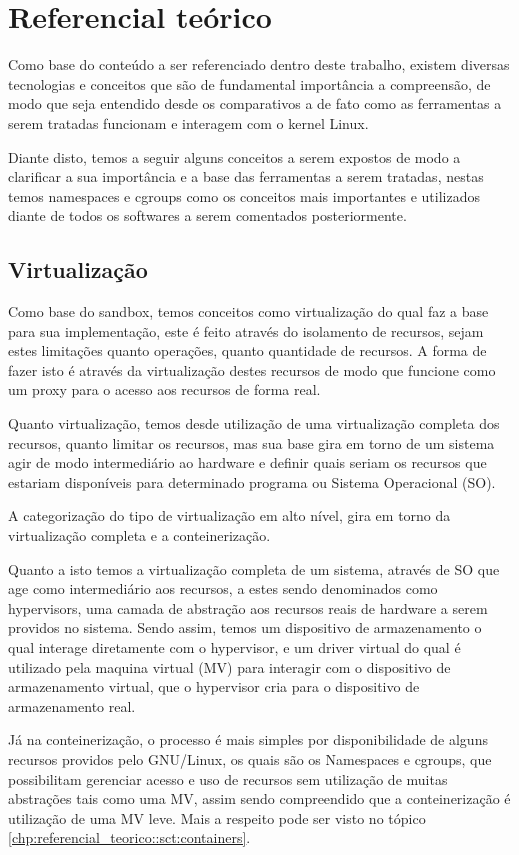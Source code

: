 \chapter{Referencial teórico}

Como base do conteúdo a ser referenciado dentro deste trabalho, existem diversas tecnologias e conceitos que são de fundamental importância a compreensão, de modo que seja entendido desde os comparativos a de fato como as ferramentas a serem tratadas funcionam e interagem com o kernel Linux.

Diante disto, temos a seguir alguns conceitos a serem expostos de modo a clarificar a sua importância e a base das ferramentas a serem tratadas, nestas temos namespaces e cgroups como os conceitos mais importantes e utilizados diante de todos os softwares a serem comentados posteriormente.

\section{Virtualização}
Como base do sandbox, temos conceitos como virtualização do qual faz a base para sua implementação, este é feito através do isolamento de recursos, sejam estes limitações quanto operações, quanto quantidade de recursos. A forma de fazer isto é através da virtualização destes recursos de modo que funcione como um proxy para o acesso aos recursos de forma real.

Quanto virtualização, temos desde utilização de uma virtualização completa dos recursos, quanto limitar os recursos, mas sua base gira em torno de um sistema agir de modo intermediário ao hardware e definir quais seriam os recursos que estariam disponíveis para determinado programa ou Sistema Operacional (SO).

A categorização do tipo de virtualização em alto nível, gira em torno da virtualização completa e a conteinerização. 

Quanto a isto temos a virtualização completa de um sistema, através de SO que age como intermediário aos recursos, a estes sendo denominados como hypervisors, uma camada de abstração aos recursos reais de hardware a serem providos no sistema. Sendo assim, temos um dispositivo de armazenamento o qual interage diretamente com o hypervisor, e um driver virtual do qual é utilizado pela maquina virtual (MV) para interagir com o dispositivo de armazenamento virtual, que o hypervisor cria para o dispositivo de armazenamento real.

Já na conteinerização, o processo é mais simples por disponibilidade de alguns recursos providos pelo GNU/Linux, os quais são os Namespaces e cgroups, que possibilitam gerenciar acesso e uso de recursos sem utilização de muitas abstrações tais como uma MV, assim sendo compreendido que a conteinerização é utilização de uma MV leve. Mais a respeito pode ser visto no tópico \ref{chp:referencial_teorico::sct:containers}.

